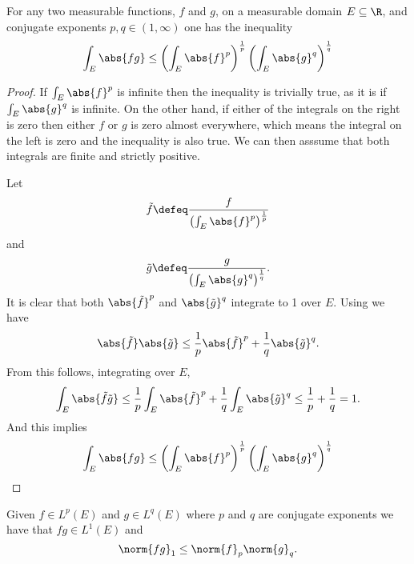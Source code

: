\documentclass[12pt,oneside]{book}
\begin{document}
\begin{theorem}\label{theo:holder}
	For any two measurable functions, \( f \) and \( g \), on a measurable domain \( E
	\subseteq \R \), and conjugate exponents \( p, q \in (1,\infty) \) one has the
	inequality
	\begin{equation*}
		\int_E \abs{fg} \leq \left(\int_E \abs{f}^p\right)^{\frac{1}{p}} \left(\int_E \abs{g}^q\right)^{\frac{1}{q}}
	\end{equation*}
\end{theorem}
\begin{proof}
	If \( \int_E \abs{f}^p \) is infinite then the inequality is trivially true, as it is if
	\( \int_E \abs{g}^q \) is infinite. On the other hand, if either of the integrals on the
	right is zero then either \( f \) or \( g \) is zero almost everywhere, which means the
	integral on the left is zero and the inequality is also true.  We can then asssume that
	both integrals are finite and strictly positive. 
	
	Let
	\begin{equation*}
		\tilde{f} \defeq \frac{f}{\left(\int_E \abs{f}^p\right)^\frac{1}{p}}
	\end{equation*}
	and
	\begin{equation*}
		\tilde{g} \defeq \frac{g}{\left(\int_E \abs{g}^q\right)^{\frac{1}{q}}}.
	\end{equation*}
	It is clear that both \( \abs{\tilde{f}}^p \) and \( \abs{\tilde{g}}^q \) integrate to 1
	over \( E \). Using  we have
	\begin{equation*}
		\abs{\tilde{f}} \abs{\tilde{g}} \leq \frac{1}{p} \abs{\tilde{f}}^p + \frac{1}{q}
		\abs{\tilde{g}}^q.
	\end{equation*}
	From this follows, integrating over \( E \),
	\begin{equation*}
		\int_E \abs{\tilde{f} \tilde{g}} \leq \frac{1}{p} \int_E \abs{\tilde{f}}^p +
		\frac{1}{q} \int_E \abs{\tilde{g}}^q \leq \frac{1}{p} + \frac{1}{q} = 1.
	\end{equation*}
	And this implies
	\begin{equation*}
		\int_E \abs{fg} \leq \left(\int_E \abs{f}^p\right)^\frac{1}{p} \left(\int_E
		\abs{g}^q\right)^\frac{1}{q}
	\end{equation*}


	
	
\end{proof}
\begin{corollary}
	Given \( f \in L^p(E) \) and \( g \in L^q(E) \) where \( p \) and \( q \) are conjugate
	exponents we have that \( fg \in L^1(E) \) and
	\begin{equation*}
		\norm{fg}_1 \leq \norm{f}_p \norm{g}_q.
	\end{equation*}
\end{corollary}	
\end{document}
